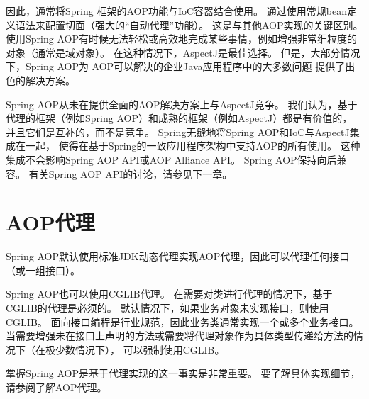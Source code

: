 因此，通常将Spring 框架的AOP功能与IoC容器结合使用。
通过使用常规bean定义语法来配置切面（强大的“自动代理”功能）。
这是与其他AOP实现的关键区别。
使用Spring AOP有时候无法轻松或高效地完成某些事情，例如增强非常细粒度的对象（通常是域对象）。
在这种情况下，AspectJ是最佳选择。
但是，大部分情况下，Spring AOP为
AOP可以解决的企业Java应用程序中的大多数问题
提供了出色的解决方案。

Spring AOP从未在提供全面的AOP解决方案上与AspectJ竞争。
 我们认为，基于代理的框架（例如Spring AOP）和成熟的框架（例如AspectJ）都是有价值的，
 并且它们是互补的，而不是竞争。 
 Spring无缝地将Spring AOP和IoC与AspectJ集成在一起，
 使得在基于Spring的一致应用程序架构中支持AOP的所有使用。
  这种集成不会影响Spring AOP API或AOP Alliance API。
   Spring AOP保持向后兼容。 有关Spring AOP API的讨论，请参见下一章。

\section{AOP代理}
Spring AOP默认使用标准JDK动态代理实现AOP代理，因此可以代理任何接口（或一组接口）。

Spring AOP也可以使用CGLIB代理。 
在需要对类进行代理的情况下，基于CGLIB的代理是必须的。 
默认情况下，如果业务对象未实现接口，则使用CGLIB。 
面向接口编程是行业规范，因此业务类通常实现一个或多个业务接口。 
当需要增强未在接口上声明的方法或需要将代理对象作为具体类型传递给方法的情况下（在极少数情况下），
可以强制使用CGLIB。

掌握Spring AOP是基于代理实现的这一事实是非常重要。 
要了解具体实现细节，请参阅了解AOP代理。